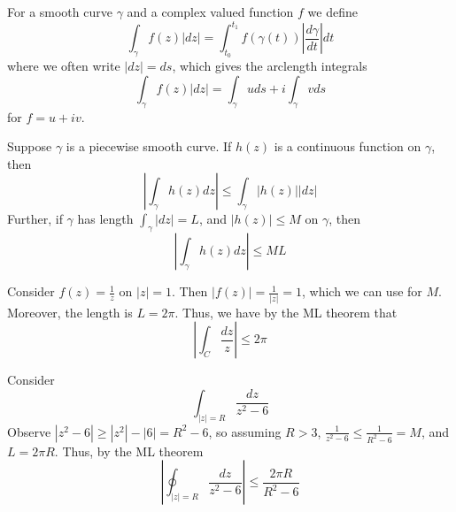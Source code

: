 \documentclass[12pt, a4paper, oneside, openright, titlepage]{book}
\begin{document}
\begin{defn}
    For a smooth curve $\gamma$ and a complex valued function $f$ we define \begin{equation*}
        \int_{\gamma}f(z)|dz| = \int_{t_0}^{t_1}f(\gamma(t))\left|\frac{d\gamma}{dt}\right|dt
    \end{equation*}
    where we often write $|dz| = ds$, which gives the arclength integrals \begin{equation*}
        \int_{\gamma}f(z)|dz| = \int_{\gamma}uds + i\int_{\gamma}vds
    \end{equation*}
    for $f = u+iv$.
\end{defn}



\begin{namthm}[ML Theorem]
    Suppose $\gamma$ is a piecewise smooth curve. If $h(z)$ is a continuous function on $\gamma$, then \begin{equation*}
        \left|\int_{\gamma}h(z)dz\right|\leq \int_{\gamma}|h(z)||dz|
    \end{equation*}
    Further, if $\gamma$ has length $\int_{\gamma}|dz| = L$, and $|h(z)| \leq M$ on $\gamma$, then \begin{equation*}
        \left|\int_{\gamma}h(z)dz\right| \leq ML
    \end{equation*}
\end{namthm}


\begin{eg}
    Consider $f(z) = \frac{1}{z}$ on $|z| = 1$. Then $|f(z)| = \frac{1}{|z|} = 1$, which we can use for $M$. Moreover, the length is $L = 2\pi$. Thus, we have by the ML theorem that \begin{equation*}
        \left|\int_C \frac{dz}{z}\right| \leq 2\pi
    \end{equation*}
\end{eg}


\begin{eg}
    Consider \begin{equation*}
        \int_{|z| = R}\frac{dz}{z^2-6}
    \end{equation*}
    Observe $|z^2 - 6| \geq |z^2| - |6| = R^2-6$, so assuming $R > 3$, $\frac{1}{z^2-6} \leq \frac{1}{R^2-6} = M$, and $L = 2\pi R$. Thus, by the ML theorem \begin{equation*}
        \left|\oint_{|z| = R}\frac{dz}{z^2-6}\right| \leq \frac{2\pi R}{R^2-6}
    \end{equation*}
\end{eg}
\end{document}
